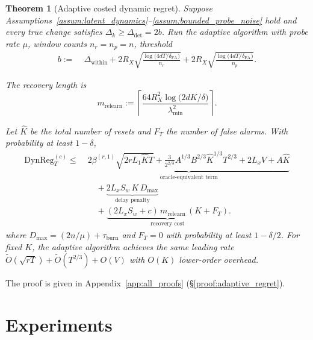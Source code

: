 \documentclass{article}
\newcommand{\DynReg}{\mathrm{DynReg}}
\newtheorem{theorem}{Theorem}
\begin{document}
\begin{theorem}[Adaptive costed dynamic regret]
\label{thm:adaptive_regret}
Suppose Assumptions~\ref{assum:latent_dynamics}--\ref{assum:bounded_probe_noise} hold and every true change satisfies $\Delta_k \ge \Delta_{\mathrm{det}} = 2b$.
Run the adaptive algorithm with probe rate $\mu$, window counts $n_r = n_p = n$, threshold
\begin{equation}
\begin{aligned}
b :=\;& \Delta_{\mathrm{within}}
+ 2R_X\sqrt{\frac{\log\!\bigl(4dT/\delta_{\mathrm{FA}}\bigr)}{n_r}}
+ 2R_X\sqrt{\frac{\log\!\bigl(4dT/\delta_{\mathrm{FA}}\bigr)}{n_p}} .
\end{aligned}
\label{eq:detector_threshold_main}
\end{equation}

The recovery length is
\begin{equation}
m_{\mathrm{relearn}}
:= \left\lceil
\frac{64 R_X^2 \log\!\bigl(2dK/\delta\bigr)}{\lambda_{\min}^2}
\right\rceil .
\end{equation}

Let \(\hat K\) be the total number of resets and \(F_T\) the number of false alarms.
With probability at least \(1-\delta\),
\begin{equation}
\begin{aligned}
\DynReg_T^{(c)} \le\;&
\underbrace{
2\beta^{(r,1)}\sqrt{2rL_1 \hat K T}
+ \frac{3}{2^{2/3}}A^{1/3}B^{2/3}\hat K^{1/3}T^{2/3}
+ 2L_x V + A\hat K
}_{\text{oracle-equivalent term}}
\\[0.5em]
&\quad
+ \underbrace{
2L_xS_w \, K \, D_{\max}
}_{\text{delay penalty}}
\\[0.5em]
&\quad
+ \underbrace{
(2L_xS_w + c)\, m_{\mathrm{relearn}}\, (K + F_T)
}_{\text{recovery cost}} .
\end{aligned}
\label{eq:adaptive_regret_bound}
\end{equation}
where $D_{\max} = (2n/\mu) + \tau_{\mathrm{burn}}$ and $F_T = 0$ with probability at least $1 - \delta/2$.
For fixed $K$, the adaptive algorithm achieves the same leading rate $\widetilde O(\sqrt{rT}) + \widetilde O(T^{2/3}) + O(V)$ with $O(K)$ lower-order overhead.
\end{theorem}

The proof is given in Appendix~\ref{app:all_proofs} (\S\ref{proof:adaptive_regret}).

\section{Experiments}
\label{sec:experiments}
\end{document}
